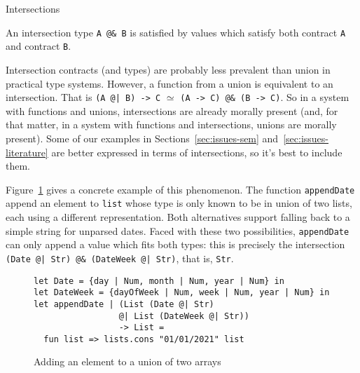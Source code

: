 \documentclass[sigplan,10pt,review,anonymous]{acmart}
\newcommand{\resolved}[2]{}
\newcommand{\nickel}[1]{\lstinline[language=nickel]{#1}}
\begin{document}
\resolved{Arnaud: this paragraph is pretty good, on the other hand, there
is no value which lets me complete the example, so this example falls
a bit flat.
Teo: Improved the example, also added another one commented that is, for me,
more realistic, but I think the one uncommented is simpler.}



\subsection{Intersections}

An intersection type \nickel{A @& B} is satisfied by values which
satisfy both contract \nickel{A} and contract \nickel{B}.

Intersection contracts (and types) are probably less prevalent than union in
practical type systems. However, a function from a union is equivalent to an
intersection. That is \nickel{(A @| B) -> C} $\simeq$ \nickel{(A -> C) @& (B ->
C)}. So in a system with functions and unions, intersections are already morally
present (and, for that matter, in a system with functions and intersections,
unions are morally present). Some of our examples in
Sections~\ref{sec:issues-sem} and~\ref{sec:issues-literature} are better
expressed in terms of intersections, so it's best to include them.

Figure~\ref{fig:addElem} gives a concrete example of this phenomenon. The
function \nickel{appendDate} append an element to \nickel{list} whose type is
only known to be in union of two lists, each using a different representation.
Both alternatives support falling back to a simple string for unparsed dates.
Faced with these two possibilities, \nickel{appendDate} can only append a
value which fits both types: this is precisely the intersection
\nickel{(Date @| Str) @& (DateWeek @| Str)}, that is, \nickel{Str}.

\begin{figure}[h]
\begin{lstlisting}[language=Nickel]
let Date = {day | Num, month | Num, year | Num} in
let DateWeek = {dayOfWeek | Num, week | Num, year | Num} in
let appendDate | (List (Date @| Str)
                 @| List (DateWeek @| Str))
                 -> List =
  fun list => lists.cons "01/01/2021" list
\end{lstlisting}
\caption{Adding an element to a union of two arrays}
\label{fig:addElem}
\end{figure}
\end{document}
